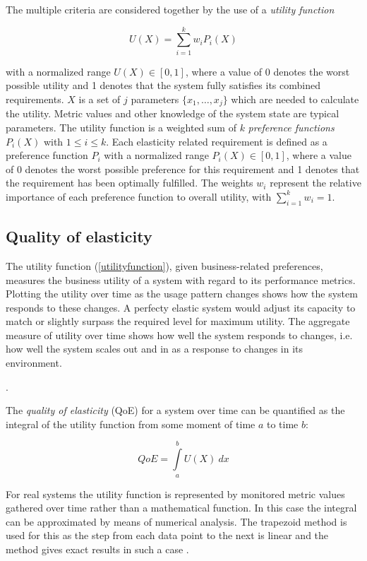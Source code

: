 \documentclass[english]{tktltiki2}
\theoremstyle{definition}
\theoremstyle{remark}
\begin{document}
The multiple criteria are considered together by the use of a \emph{utility
function}

\begin{equation}
U(X) = \sum\limits_{i=1}^k w_{i}P_{i}(X) \label{utilityfunction}
\end{equation}

with a normalized range $U(X) \in [0, 1]$, where a value of 0 denotes the worst
possible utility and 1 denotes that the system fully satisfies its combined
requirements. $X$ is a set of $j$ parameters $\{x_{1}, \dots, x_{j}\}$ which are
needed to calculate the utility. Metric values and other knowledge of the system
state are typical parameters. The utility function is a weighted sum of $k$
\emph{preference functions} $P_{i}(X)$ with $1 \le i \le k$. Each elasticity
related requirement is defined as a preference function $P_{i}$ with a
normalized range $P_{i}(X) \in [0, 1]$, where a value of 0 denotes the worst
possible preference for this requirement and 1 denotes that the requirement has
been optimally fulfilled. The weights $w_{i}$ represent the relative importance
of each preference function to overall utility, with $\sum_{i=1}^k w_{i} = 1$.


\subsection{Quality of elasticity} The utility function (\ref{utilityfunction}),
given business-related preferences, measures the business utility of a system
with regard to its performance metrics. Plotting the utility over time as the
usage pattern changes shows how the system responds to these changes. A perfecty
elastic system would adjust its capacity to match or slightly surpass the
required level for maximum utility. The aggregate measure of utility over time
shows how well the system responds to changes, i.e. how well the system scales
out and in as a response to changes in its environment.

.

The \emph{quality of elasticity} (QoE) for a system over time can be quantified
as the integral of the utility function from some moment of time $a$ to time
$b$:

\begin{equation}
QoE = \int\limits_a^b U(X)~dx \label{qoefunction}
\end{equation}

For real systems the utility function is represented by monitored metric values
gathered over time rather than a mathematical function. In this case the
integral can be approximated by means of numerical analysis. The trapezoid
method  is used for this as the step from each data
point to the next is linear and the method gives exact results in such a case
.
\end{document}
